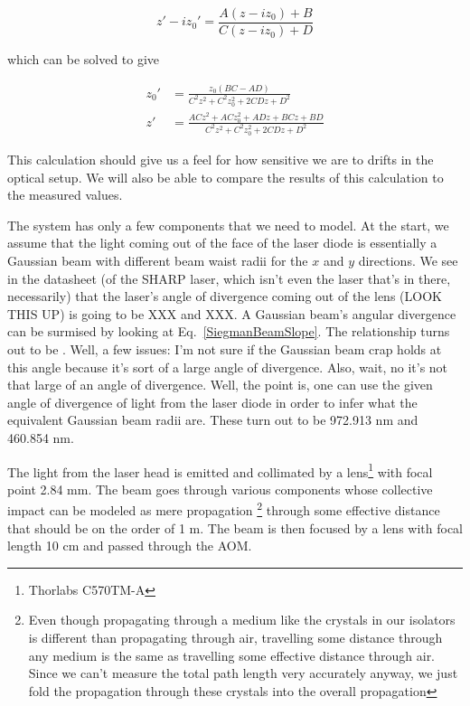 \begin{equation}
z'-iz_0'=\frac{A(z-iz_0)+B}{C(z-iz_0)+D}
\end{equation}
\cite{BYUOpticsBook}

which can be solved to give 

\begin{align}
z_0' &= \frac{ z_0 (BC-AD)}{C^2z^2+C^2z_0^2+2 C D z + D^2} \\
z' &=\frac{AC z^2+ACz_0^2+ADz+BCz+BD}{C^2z^2+C^2z_0^2+2 C D z + D^2}
\end{align}

This calculation should give us a feel for how sensitive we are to drifts in the optical setup. We will also be able to compare the results of this calculation to the measured values. 

The system has only a few components that we need to model. At the start, we assume that the light coming out of the face of the laser diode is essentially a Gaussian beam with different beam waist radii for the $x$ and $y$ directions. We see in the datasheet (of the SHARP laser, which isn't even the laser that's in there, necessarily) that the laser's angle of divergence coming out of the lens (LOOK THIS UP) is going to be XXX and XXX. A Gaussian beam's angular divergence can be surmised by looking at Eq.\ \ref{SiegmanBeamSlope}. The relationship turns out to be \cite{MellesGriotGaussian}. Well, a few issues: I'm not sure if the Gaussian beam crap holds at this angle because it's sort of a large angle of divergence. Also, wait, no it's not that large of an angle of divergence. Well, the point is, one can use the given angle of divergence of light from the laser diode in order to infer what the equivalent Gaussian beam radii are. These turn out to be 972.913 nm and 460.854 nm. 

The light from the laser head is emitted and collimated by a lens\footnote{Thorlabs C570TM-A} with focal point 2.84 mm.%
 The beam goes through various components whose collective impact can be modeled as mere propagation 
\footnote{Even though propagating through a medium like the crystals in our isolators is different than propagating through air, travelling some distance through any medium is the same as travelling some effective distance through air. Since we can't measure the total path length very accurately anyway, we just fold the propagation through these crystals into the overall propagation}
through some effective distance that should be on the order of 1 m. The beam is then focused by a lens with focal length 10 cm and passed through the AOM. 

